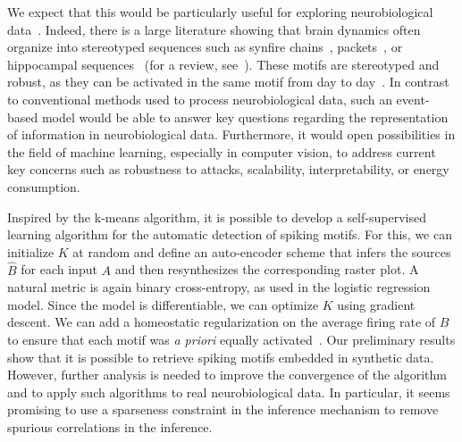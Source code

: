 \documentclass[runningheads]{llncs}
\newcommand{\kernel}{K} %
\begin{document}
We expect that this would be particularly useful for exploring neurobiological data~\cite{mackevicius_unsupervised_2019}. Indeed, there is a large literature showing that brain dynamics often organize into stereotyped sequences such as synfire chains~\cite{ikegaya_synfire_2004}, packets~\cite{luczak_sequential_2007}, or hippocampal sequences~\cite{pastalkova_internally_2008,villette_internally_2015} (for a review, see~\cite{grimaldi_precise_2022}). These motifs are stereotyped and robust, as they can be activated in the same motif from day to day~\cite{haimerl_internal_2019}. In contrast to conventional methods used to process neurobiological data, such an event-based model would be able to answer key questions regarding the representation of information in neurobiological data. Furthermore, it would open possibilities in the field of machine learning, especially in computer vision, to address current key concerns such as robustness to attacks, scalability, interpretability, or energy consumption.

Inspired by the k-means algorithm, it is possible to develop a self-supervised learning algorithm for the automatic detection of spiking motifs. For this, we can initialize $\kernel$ at random and define an auto-encoder scheme that infers the sources $\hat{B}$ for each input $A$ and then resynthesizes the corresponding raster plot. A natural metric is again binary cross-entropy, as used in the logistic regression model. Since the model is differentiable, we can optimize $\kernel$ using gradient descent. We can add a homeostatic regularization on the average firing rate of $B$ to ensure that each motif was \emph{a priori} equally activated~\cite{perrinet_adaptive_2019}. Our preliminary results show that it is possible to retrieve spiking motifs embedded in synthetic data. However, further analysis is needed to improve the convergence of the algorithm and to apply such algorithms to real neurobiological data. In particular, it seems promising to use a sparseness constraint in the inference mechanism to remove spurious correlations in the inference.
%

%

%
  
  
\end{document}
